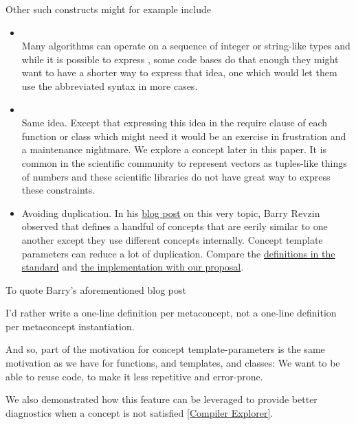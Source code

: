 \documentclass{wg21}
\begin{document}
Other such constructs might for example include
\begin{itemize}
\item {}\\
    Many algorithms can operate on a sequence of integer or string-like types and while it is possible to express
    , some code bases do that enough they might want to have a shorter way to express that idea,
    one which would let them use the abbreviated syntax in more cases.

\item {} \\
    Same idea. Except that expressing this idea in the require clause of each function or class which might need it would be an exercise in frustration and a maintenance nightmare. We explore a  concept later in this paper.
    It is common in the scientific community to represent vectors as tuples-like things of numbers and these scientific libraries do not have great way to express these constraints.

\item Avoiding duplication. In his \href{https://brevzin.github.io/c++/2019/01/09/concept-templates/}{blog post} on this very topic, Barry Revzin observed that  defines a handful of concepts that
are eerily similar to one another except they use different concepts internally. Concept template parameters can reduce a lot of duplication.
Compare the \href{https://eel.is/c++draft/indirectcallable.indirectinvocable}{definitions in the standard} and \href{https://godbolt.org/z/ohKsoKh9G}{the implementation with our proposal}.
\end{itemize}

To quote Barry's aforementioned blog post
\begin{quoteblock}
I’d rather write a one-line definition per metaconcept, not a one-line definition per metaconcept instantiation.
\end{quoteblock}

And so, part of the motivation for concept template-parameters is the same motivation as we have for functions, and templates, and classes:
We want to be able to reuse code, to make it less repetitive and error-prone.


We also demonstrated how this feature can be leveraged to provide better diagnostics when a concept is not satisfied \href{https://compiler-explorer.com/z/sPz5faEbP}{[Compiler Explorer]}.
\end{document}
